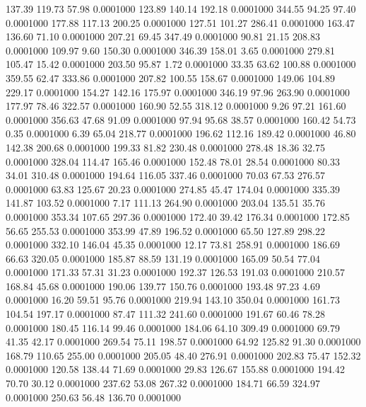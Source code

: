  137.39  119.73   57.98   0.0001000
 123.89  140.14  192.18   0.0001000
 344.55   94.25   97.40   0.0001000
 177.88  117.13  200.25   0.0001000
 127.51  101.27  286.41   0.0001000
 163.47  136.60   71.10   0.0001000
 207.21   69.45  347.49   0.0001000
  90.81   21.15  208.83   0.0001000
 109.97    9.60  150.30   0.0001000
 346.39  158.01    3.65   0.0001000
 279.81  105.47   15.42   0.0001000
 203.50   95.87    1.72   0.0001000
  33.35   63.62  100.88   0.0001000
 359.55   62.47  333.86   0.0001000
 207.82  100.55  158.67   0.0001000
 149.06  104.89  229.17   0.0001000
 154.27  142.16  175.97   0.0001000
 346.19   97.96  263.90   0.0001000
 177.97   78.46  322.57   0.0001000
 160.90   52.55  318.12   0.0001000
   9.26   97.21  161.60   0.0001000
 356.63   47.68   91.09   0.0001000
  97.94   95.68   38.57   0.0001000
 160.42   54.73    0.35   0.0001000
   6.39   65.04  218.77   0.0001000
 196.62  112.16  189.42   0.0001000
  46.80  142.38  200.68   0.0001000
 199.33   81.82  230.48   0.0001000
 278.48   18.36   32.75   0.0001000
 328.04  114.47  165.46   0.0001000
 152.48   78.01   28.54   0.0001000
  80.33   34.01  310.48   0.0001000
 194.64  116.05  337.46   0.0001000
  70.03   67.53  276.57   0.0001000
  63.83  125.67   20.23   0.0001000
 274.85   45.47  174.04   0.0001000
 335.39  141.87  103.52   0.0001000
   7.17  111.13  264.90   0.0001000
 203.04  135.51   35.76   0.0001000
 353.34  107.65  297.36   0.0001000
 172.40   39.42  176.34   0.0001000
 172.85   56.65  255.53   0.0001000
 353.99   47.89  196.52   0.0001000
  65.50  127.89  298.22   0.0001000
 332.10  146.04   45.35   0.0001000
  12.17   73.81  258.91   0.0001000
 186.69   66.63  320.05   0.0001000
 185.87   88.59  131.19   0.0001000
 165.09   50.54   77.04   0.0001000
 171.33   57.31   31.23   0.0001000
 192.37  126.53  191.03   0.0001000
 210.57  168.84   45.68   0.0001000
 190.06  139.77  150.76   0.0001000
 193.48   97.23    4.69   0.0001000
  16.20   59.51   95.76   0.0001000
 219.94  143.10  350.04   0.0001000
 161.73  104.54  197.17   0.0001000
  87.47  111.32  241.60   0.0001000
 191.67   60.46   78.28   0.0001000
 180.45  116.14   99.46   0.0001000
 184.06   64.10  309.49   0.0001000
  69.79   41.35   42.17   0.0001000
 269.54   75.11  198.57   0.0001000
  64.92  125.82   91.30   0.0001000
 168.79  110.65  255.00   0.0001000
 205.05   48.40  276.91   0.0001000
 202.83   75.47  152.32   0.0001000
 120.58  138.44   71.69   0.0001000
  29.83  126.67  155.88   0.0001000
 194.42   70.70   30.12   0.0001000
 237.62   53.08  267.32   0.0001000
 184.71   66.59  324.97   0.0001000
 250.63   56.48  136.70   0.0001000
